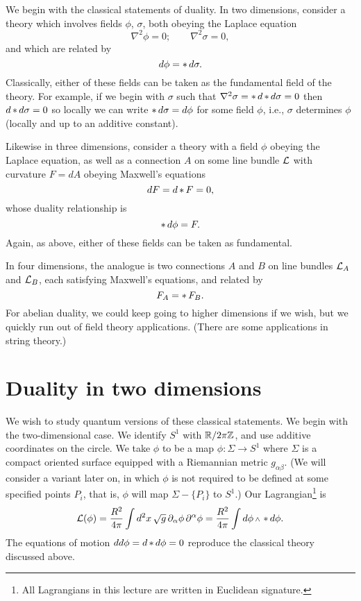 We begin with the classical statements of duality.  In two dimensions, consider
a theory which involves fields $\phi$, $\sigma$, both obeying the
Laplace equation
\begin{equation}
\nabla^2\phi=0; \qquad \nabla^2\sigma=0,
\end{equation}
and which are related by
\begin{equation}
d\phi=\mathop{*} d\sigma.
\end{equation}
Classically, either of these fields can be taken as the fundamental field of
the
theory.  For example, if we begin with $\sigma$ such that
$\nabla^2\sigma=\mathop{*} d\mathop{*} d\sigma=0$ then $d\mathop{*}
d\sigma=0$ so locally we can write $\mathop{*} d\sigma=d\phi$ for some field
$\phi$,
i.e., $\sigma$ determines $\phi$ (locally and up to an additive constant).

Likewise in three dimensions, consider a theory with a field $\phi$ obeying
the Laplace
equation, as well as a connection $A$ on some line bundle ${\cal L}$ with curvature
$F=dA$ obeying Maxwell's equations
\begin{equation}
dF=d\mathop{*} F=0,
\end{equation}
whose duality relationship is
\begin{equation}
\mathop{*} d\phi=F.
\end{equation}
Again, as above, either of these fields can be taken as fundamental.

In four dimensions, the analogue is two connections $A$ and $B$ on line bundles
${\cal L}_A$ and ${\cal L}_B$, each satisfying Maxwell's equations, and related by
\begin{equation}
F_A=\mathop{*} F_B.
\end{equation}
For abelian duality, we could keep going to higher dimensions if we wish, but
we quickly run out of field theory applications.  (There are some applications
in string theory.)

\section{Duality in two dimensions}

We wish to study quantum versions of these classical statements.  We begin with
the two-dimensional case.  We identify $S^1$ with ${\Bbb R}/2\pi{\Bbb Z}$, and use
additive coordinates on the circle.  We take $\phi$ to be a map
$\phi:\Sigma\to S^1$ where
$\Sigma$ is a compact oriented surface equipped with a Riemannian metric
$g_{\alpha\beta}$.
(We will consider a variant later on, in
which $\phi$ is not required to be defined at some specified points $P_i$, that
is, $\phi$ will map $\Sigma-\{ P_i\}$ to $S^1$.)  Our Lagrangian\footnote{All
Lagrangians in this lecture are written in Euclidean signature.} is
\begin{equation}
\lg(\phi) = \frac{R^2}{4\pi}\int d^2x\,\sqrt{g}\,\partial_\alpha\phi \,
\partial^\alpha\phi = \frac{R^2}{4\pi}\int d\phi\wdg\hstar d\phi.
\end{equation}
The equations of motion $dd\phi=d\mathop{*} d\phi=0$ reproduce the classical theory
discussed above.

